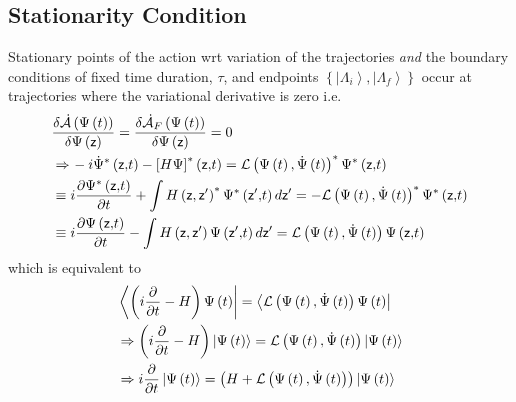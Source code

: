 \documentclass[aps,preprint]{revtex4}
\begin{document}
\subsection{Stationarity Condition}

Stationary points of the action wrt variation of the trajectories \emph{and}
the boundary conditions of fixed time duration, $\tau$, and endpoints $%
\left\{ \left| \Lambda_{i}\right\rangle ,\left| \Lambda_{f}\right\rangle
\right\} $ occur at trajectories where the variational derivative is zero
i.e. 
\begin{align}
& \frac{\delta\mathcal{\dot{A}}\left( \Psi\left( t\right) \right) }{%
\delta\Psi\left( \mathsf{z}\right) }=\frac{\delta\mathcal{\dot{A}}_{F}\left(
\Psi\left( t\right) \right) }{\delta\Psi\left( \mathsf{z}\right) }=0  \notag
\\
& \left. \Rightarrow\right. -i\dot{\Psi}^{\ast}\left( \mathsf{z,}t\right) -%
\left[ H\Psi\right] ^{\ast}\left( \mathsf{z,}t\right) =\mathcal{L}\left(
\Psi\left( t\right) ,\dot{\Psi}\left( t\right) \right) ^{\ast}\Psi^{\ast
}\left( \mathsf{z,}t\right)  \notag \\
& \left. \equiv\right. i\frac{\partial\Psi^{\ast}\left( \mathsf{z,}t\right) 
}{\partial t}+\int H\left( \mathsf{z,z}^{\prime}\right) ^{\ast
}\Psi^{\ast}\left( \mathsf{z}^{\prime}\mathsf{,}t\right) d\mathsf{z}%
^{\prime}=-\mathcal{L}\left( \Psi\left( t\right) ,\dot{\Psi}\left( t\right)
\right) ^{\ast}\Psi^{\ast}\left( \mathsf{z,}t\right)  \notag \\
& \left. \equiv\right. i\frac{\partial\Psi\left( \mathsf{z,}t\right) }{%
\partial t}-\int H\left( \mathsf{z,z}^{\prime}\right) \Psi\left( \mathsf{z}%
^{\prime}\mathsf{,}t\right) d\mathsf{z}^{\prime}=\mathcal{L}\left(
\Psi\left( t\right) ,\dot{\Psi}\left( t\right) \right) \Psi\left( \mathsf{z,}%
t\right)  \label{preSEden}
\end{align}
which is equivalent to 
\begin{align}
& \left\langle \left( i\frac{\partial}{\partial t}-H\right) \Psi\left(
t\right) \right| =\left\langle \mathcal{L}\left( \Psi\left( t\right) ,\dot{%
\Psi}\left( t\right) \right) \Psi\left( t\right) \right|  \notag \\
& \Rightarrow\left( i\frac{\partial}{\partial t}-H\right) \left| \Psi\left(
t\right) \right\rangle =\mathcal{L}\left( \Psi\left( t\right) ,\dot{\Psi}%
\left( t\right) \right) \left| \Psi\left( t\right) \right\rangle  \notag \\
& \Rightarrow i\frac{\partial}{\partial t}\left| \Psi\left( t\right)
\right\rangle =\left( H+\mathcal{L}\left( \Psi\left( t\right) ,\dot{\Psi }%
\left( t\right) \right) \right) \left| \Psi\left( t\right) \right\rangle
\label{preSE}
\end{align}
\end{document}
